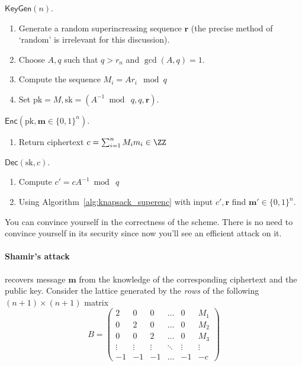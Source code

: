 \documentclass[11pt]{exam}
\theoremstyle{definition}
\let\vec\mathbf
\begin{document}
\medskip

$\mathsf{KeyGen}(n)$.
\begin{enumerate}
	\item Generate a random superincreasing sequence $\vec r$ (the precise method of `random' is irrelevant for this discussion).
	\item Choose $A, q$ such that $q>r_n$ and $\gcd(A,q) = 1$.
	\item Compute the sequence $M_i = Ar_i~\bmod q$
	\item Set $\mathrm{pk} = M, \mathrm{sk} = (A^{-1}\bmod~q, q, \vec r)$.
\end{enumerate}

\medskip

$\mathsf{Enc}(\mathrm{pk}, \vec m \in \{ 0,1\}^n)$.
\begin{enumerate}
	\item Return ciphertext $c = \sum_{i=1}^n M_i m_i \in \ZZ$
\end{enumerate}

\medskip
$\mathsf{Dec}(\mathrm{sk}, c)$.
\begin{enumerate}
	\item Compute $c' = c A^{-1}\bmod~q$
	\item Using Algorithm~\ref{alg:knapsack_superenc} with input $c', \vec r$ find $\vec m' \in \{0,1\}^n$.
\end{enumerate}

You can convince yourself in the correctness of the scheme. There is no need to convince yourself in its security since now you'll see an efficient attack on it.

\medskip

\paragraph{Shamir's attack} recovers message $\vec m$ from the knowledge of the corresponding ciphertext and the public key. Consider the lattice generated by the \emph{rows} of the following $(n+1) \times (n+1)$ matrix
\[
	B = 
	\begin{pmatrix}
		2 & 0 & 0 & \ldots & 0 & M_1 \\
		0 & 2 & 0 & \ldots & 0 & M_2 \\
		0 & 0 & 2 & \ldots & 0 & M_3 \\
		\vdots & \vdots & \vdots & \ddots & \vdots & \vdots \\
		-1 & -1 & -1 & \ldots & -1 & -c 
	\end{pmatrix}
\]
\end{document}
